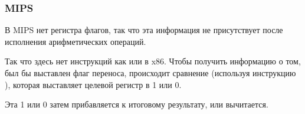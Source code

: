 \subsubsection{MIPS}



В MIPS нет регистра флагов, так что эта информация не присутствует после исполнения арифметических операций.

Так что здесь нет инструкций как  или  в x86.
Чтобы получить информацию о том, был бы выставлен флаг переноса, происходит сравнение (используя инструкцию
), которая выставляет целевой регистр в 1 или 0.

Эта 1 или 0 затем прибавляется к итоговому результату, или вычитается.

